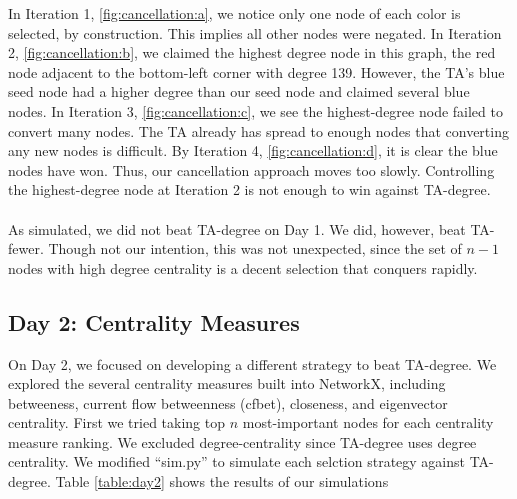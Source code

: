 \documentclass[letterpaper, 11pt]{article}
\begin{document}
In  Iteration 1, \ref{fig:cancellation:a}, we notice only one node of each color is selected, by construction. This implies all other nodes were negated. In Iteration 2,  \ref{fig:cancellation:b}, we claimed the highest degree node in this graph, the red node adjacent to the bottom-left corner with degree 139. However, the TA's blue seed node had a higher degree than our seed node and claimed several blue nodes. In Iteration 3, \ref{fig:cancellation:c}, we see the highest-degree node failed to convert many nodes. The TA already has spread to enough nodes that converting any new nodes is difficult. By Iteration 4, \ref{fig:cancellation:d}, it is clear the blue nodes have won. Thus, our cancellation approach moves too slowly. Controlling the highest-degree node at Iteration 2 is not enough to win against TA-degree.
\\\\
As simulated, we did not beat TA-degree on Day 1. We did, however, beat TA-fewer. Though not our intention, this was not unexpected, since the set of $n-1$ nodes with high degree centrality is a decent selection that conquers rapidly.

\subsection{Day 2: Centrality Measures}
On Day 2, we focused on developing a different strategy to beat TA-degree. We explored the several centrality measures built into NetworkX, including betweeness, current flow betweenness (cfbet), closeness, and eigenvector centrality. First we tried taking top $n$ most-important nodes for each centrality measure ranking. We excluded degree-centrality since TA-degree uses degree centrality. We modified ``sim.py'' to simulate each selction strategy against TA-degree. Table \ref{table:day2} shows the results of our simulations
\end{document}
